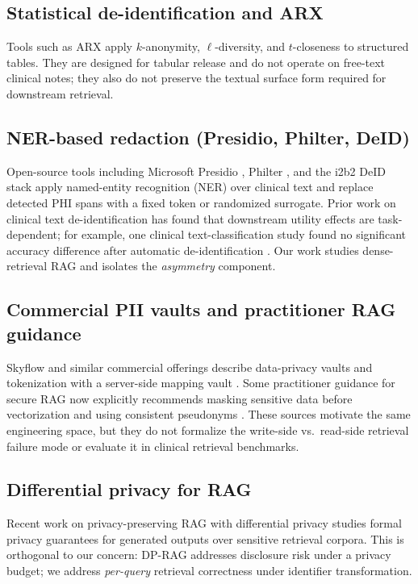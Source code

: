 \documentclass[11pt,a4paper]{article}
\begin{document}
\subsection{Statistical de-identification and ARX}

Tools such as ARX \cite{prasser2020arx} apply $k$-anonymity, $\ell$-diversity,
and $t$-closeness to structured tables. They are designed for tabular
release and do not operate on free-text clinical notes; they also do not
preserve the textual surface form required for downstream retrieval.

\subsection{NER-based redaction (Presidio, Philter, DeID)}

Open-source tools including Microsoft Presidio \cite{presidio2024}, Philter
\cite{philter2020}, and the i2b2 DeID stack \cite{stubbs2015deid} apply
named-entity recognition (NER) over clinical text and replace detected PHI
spans with a fixed token or randomized surrogate. Prior work on clinical
text de-identification has found that downstream utility effects are
task-dependent; for example, one clinical text-classification study found no
significant accuracy difference after automatic de-identification
\cite{obeid2019}. Our work studies dense-retrieval RAG and isolates the
\emph{asymmetry} component.

\subsection{Commercial PII vaults and practitioner RAG guidance}

Skyflow and similar commercial offerings describe data-privacy vaults and
tokenization with a server-side mapping vault \cite{skyflow_vault}. Some
practitioner guidance for secure RAG now explicitly recommends masking
sensitive data before vectorization and using consistent pseudonyms
\cite{protecto_securerag}. These sources motivate the same engineering
space, but they do not formalize the write-side vs.\ read-side retrieval
failure mode or evaluate it in clinical retrieval benchmarks.

\subsection{Differential privacy for RAG}

Recent work on privacy-preserving RAG with differential privacy
\cite{koga2024dprag} studies formal privacy guarantees for generated outputs
over sensitive retrieval corpora. This is orthogonal to our concern: DP-RAG
addresses disclosure risk under a privacy budget; we address \emph{per-query}
retrieval correctness under identifier transformation.
\end{document}
